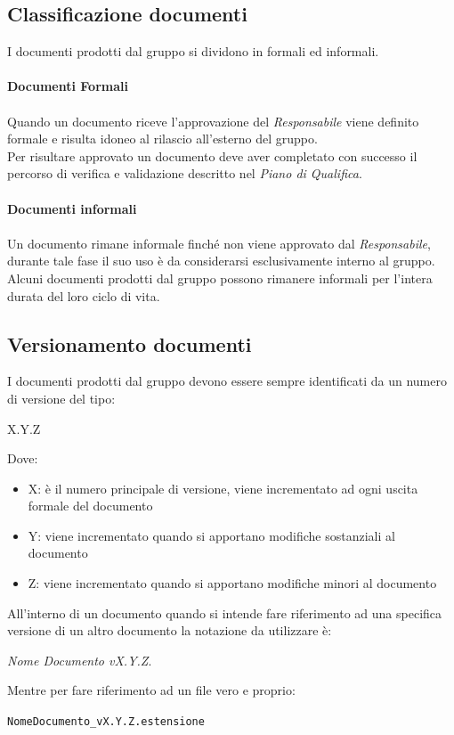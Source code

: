 \documentclass[a4paper]{report}
\begin{document}
			\subsection{Classificazione documenti}
				I documenti prodotti dal gruppo si dividono in formali ed informali. \\ \\
				\textbf{Documenti Formali} \\ \\
					Quando un documento riceve l'approvazione del \emph{Responsabile} viene definito formale e risulta idoneo
					al rilascio all'esterno del gruppo. \\
					Per risultare approvato un documento deve aver completato con successo il percorso di verifica e validazione 
					descritto nel \emph{Piano di Qualifica}. \\ \\
				\textbf{Documenti informali} \\ \\
					Un documento rimane informale finché non viene approvato dal \emph{Responsabile}, durante tale fase 
					il suo uso è da considerarsi esclusivamente interno al gruppo. \\
					Alcuni documenti prodotti dal gruppo possono rimanere informali per l'intera durata del loro ciclo di vita.
			\subsection{Versionamento documenti}
				I documenti prodotti dal gruppo devono essere sempre identificati da un numero di versione del tipo:
				\begin{center}
					 X.Y.Z
				\end{center}
				Dove:
				\begin{itemize}
					\item X: è il numero principale di versione, viene incrementato ad ogni uscita formale del documento
					\item Y: viene incrementato quando si apportano modifiche sostanziali al documento
					\item Z: viene incrementato quando si apportano modifiche minori al documento
				\end{itemize}
				All'interno di un documento quando si intende fare riferimento ad una specifica versione di un altro documento la
				 notazione da utilizzare è: 
				\begin{center}
					\emph{Nome Documento vX.Y.Z}.
				\end{center}
				Mentre per fare riferimento ad un file vero e proprio:
				\begin{center}
					\verb|NomeDocumento_vX.Y.Z.estensione|
				\end{center}
\end{document}
